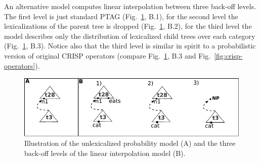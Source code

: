 An alternative model computes linear interpolation between three back-off levels. The first level is just standard PTAG (Fig.~\ref{fig:modelillustration}, B.1), for the second level the lexicalizations of the parent tree is dropped (Fig.~\ref{fig:modelillustration}, B.2), for the third level the model describes only the distribution of lexicalized child trees over each category (Fig.~\ref{fig:modelillustration}, B.3).  
Notice also that the third level is similar in spirit to a probabilistic version of original CRISP operators (compare Fig.~\ref{fig:modelillustration}, B.3 and Fig.~\ref{fig:crisp-operators}). 
\begin{figure}[t]
\begin{center}
\includegraphics[width=.5\textwidth]{figures/modelillustration}
\caption{\label{fig:modelillustration} Illustration of the unlexicalized probability model (A) and the three back-off levels of the linear interpolation model (B).}

\end{center}
\end{figure}










